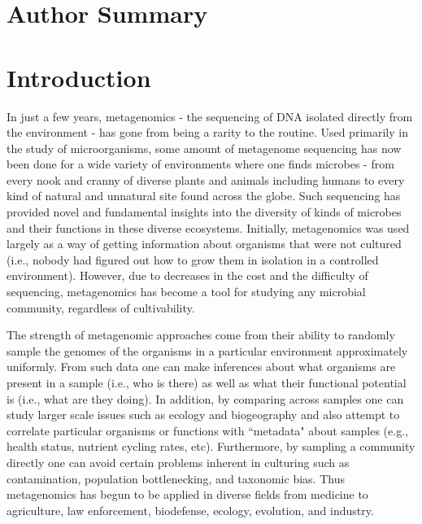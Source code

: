 \documentclass[10pt]{article}
\begin{document}
\section*{Author Summary}

\section*{Introduction}

In just a few years, metagenomics - the sequencing of DNA isolated directly from the environment - has gone from being a rarity to the routine.
Used primarily in the study of microorganisms, some amount of metagenome sequencing has now been done for a wide variety of environments where one finds microbes - from every nook and cranny of diverse plants and animals including humans to every kind of natural and unnatural site found across the globe.
Such sequencing has provided novel and fundamental insights into the diversity of kinds of microbes and their functions in these diverse ecosystems.
Initially, metagenomics was used largely as a way of getting information about organisms that were not cultured (i.e., nobody had figured out how to grow them in isolation in a controlled environment).
However, due to decreases in the cost and the difficulty of sequencing, metagenomics has become a tool for studying any microbial community, regardless of cultivability.

The strength of metagenomic approaches come from their ability to randomly sample the genomes of the organisms in a particular environment approximately uniformly.
From such data one can make inferences about what organisms are present in a sample (i.e., who is there) as well as what their functional potential is (i.e., what are they doing).
In addition, by comparing across samples one can study larger scale issues such as ecology and biogeography and also attempt to correlate particular organisms or functions with ``metadata" about samples (e.g., health status, nutrient cycling rates, etc).
Furthermore, by sampling a community directly one can avoid certain problems inherent in culturing such as contamination, population bottlenecking, and taxonomic bias.
Thus metagenomics has begun to be applied in diverse fields from medicine to agriculture, law enforcement, biodefense, ecology, evolution, and industry.
\end{document}

